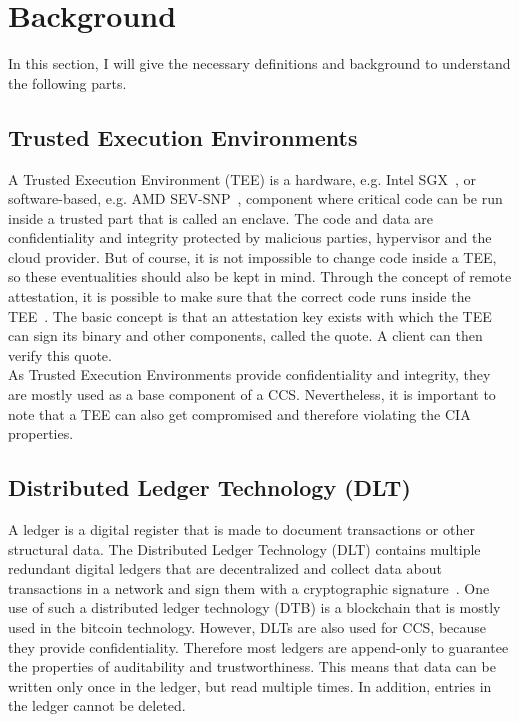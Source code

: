 \section{Background}
In this section, I will give the necessary definitions and background to understand the following parts. 
\subsection{Trusted Execution Environments}
A Trusted Execution Environment (TEE) is a hardware, e.g. Intel SGX~\cite{sgx}, or software-based, e.g. AMD SEV-SNP~\cite{amd}, component where critical code can be run inside a trusted part that is called an enclave. The code and data are confidentiality and integrity protected by malicious parties, hypervisor and the cloud provider.  But of course, it is not impossible to change code inside a TEE, so these eventualities should also be kept in mind. Through the concept of remote attestation, it is possible to make sure that the correct code runs inside the TEE~\cite{remoteAttestation}.  The basic concept is that an attestation key exists with which the TEE can sign its binary and other components, called the quote. A client can then verify this quote. \\ %
As Trusted Execution Environments provide confidentiality and integrity, they are mostly used as a base component of a CCS. Nevertheless, it is important to note that a TEE can also get compromised and therefore violating the CIA properties.
\subsection{Distributed Ledger Technology (DLT)}
A ledger is a digital register that is made to document transactions or other structural data. The Distributed Ledger Technology (DLT) contains multiple redundant digital ledgers that are decentralized and collect data about transactions in a network and sign them with a cryptographic signature~\cite{ledger}. One use of such a distributed ledger technology (DTB) is a blockchain that is mostly used in the bitcoin technology. However, DLTs are also used for CCS, because they provide confidentiality. Therefore most ledgers are append-only to guarantee the properties of auditability and trustworthiness. This means that data can be written only once in the ledger, but read multiple times. In addition, entries in the ledger cannot be deleted. 
